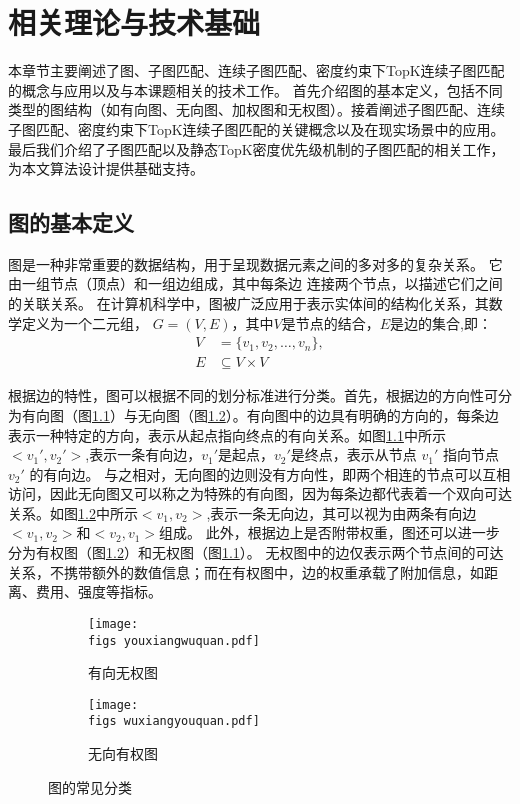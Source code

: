 \chapter{相关理论与技术基础}
本章节主要阐述了图、子图匹配、连续子图匹配、密度约束下TopK连续子图匹配的概念与应用以及与本课题相关的技术工作。
首先介绍图的基本定义，包括不同类型的图结构（如有向图、无向图、加权图和无权图）。接着阐述子图匹配、连续子图匹配、密度约束下TopK连续子图匹配的关键概念以及在现实场景中的应用。
最后我们介绍了子图匹配以及静态TopK密度优先级机制的子图匹配的相关工作，为本文算法设计提供基础支持。
\section{图的基本定义}
图是一种非常重要的数据结构，用于呈现数据元素之间的多对多的复杂关系。
它由一组节点（顶点）和一组边组成，其中每条边 连接两个节点，以描述它们之间的关联关系。
在计算机科学中，图被广泛应用于表示实体间的结构化关系，其数学定义为一个二元组，
$G=(V,E)$，其中$V$是节点的结合，$E$是边的集合,即：
\begin{equation}
    \begin{split}
        V &= \{ v_1, v_2, \dots, v_n \}, \\
        E &\subseteq V \times V
    \end{split}
\end{equation}

根据边的特性，图可以根据不同的划分标准进行分类。首先，根据边的方向性可分为有向图（图\ref{fig:example_noweight}）与无向图（图\ref{fig:example_weight}）。有向图中的边具有明确的方向的，每条边表示一种特定的方向，表示从起点指向终点的有向关系。如图\ref{fig:example_noweight}中所示$<v_1',v_2'>$,表示一条有向边，$v_1'$是起点，$v_2'$是终点，表示从节点 $v_1'$ 指向节点 $v_2'$ 的有向边。
与之相对，无向图的边则没有方向性，即两个相连的节点可以互相访问，因此无向图又可以称之为特殊的有向图，因为每条边都代表着一个双向可达关系。如图\ref{fig:example_weight}中所示$<v_1,v_2>$,表示一条无向边，其可以视为由两条有向边$<v_1,v_2>$和$<v_2,v_1>$组成。
此外，根据边上是否附带权重，图还可以进一步分为有权图（图\ref{fig:example_weight}）和无权图（图\ref{fig:example_noweight}）。
无权图中的边仅表示两个节点间的可达关系，不携带额外的数值信息；而在有权图中，边的权重承载了附加信息，如距离、费用、强度等指标。

\begin{figure}[h!]
    \def\wscorevone{0.48}
    \centering
        \begin{subfigure}[t]{\wscorevone\linewidth}
            \centering
            \resizebox{\linewidth}{!}
            {
                \texttt{[image: \\figs youxiangwuquan.pdf]}
            }
            \caption{有向无权图}
            \label{fig:example_noweight}
        \end{subfigure}
        \hfill
        \begin{subfigure}[t]{\wscorevone\linewidth}
            \centering
            \resizebox{\linewidth}{!}
            {
                \texttt{[image: \\figs wuxiangyouquan.pdf]}
            }
            \caption{无向有权图}
            \label{fig:example_weight}
        \end{subfigure}
        \label{fig:definition}
        \caption{图的常见分类}
    \end{figure}

